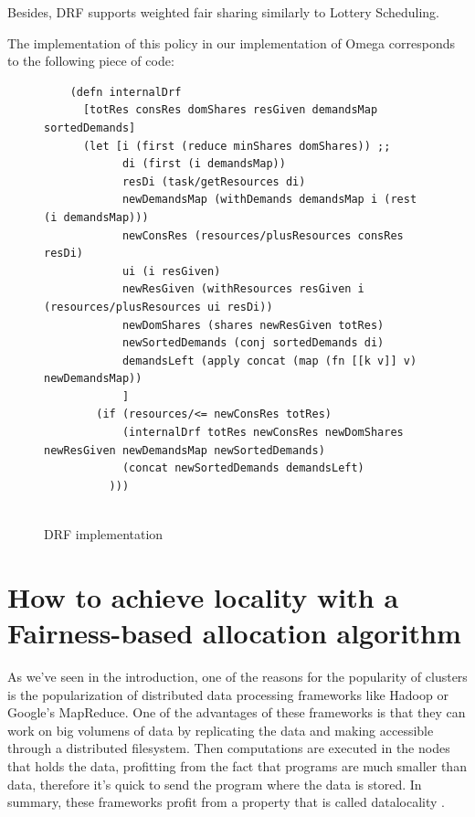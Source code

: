 \documentclass{report}                     %
\begin{document}
Besides, DRF supports weighted fair sharing similarly to Lottery
Scheduling. 

The implementation of this policy in our implementation of Omega
corresponds to the following piece of code:


\begin{figure}[!ht]
\centering
\begin{verbatim}
    (defn internalDrf
      [totRes consRes domShares resGiven demandsMap sortedDemands]
      (let [i (first (reduce minShares domShares)) ;;
            di (first (i demandsMap))
            resDi (task/getResources di)
            newDemandsMap (withDemands demandsMap i (rest (i demandsMap)))
            newConsRes (resources/plusResources consRes resDi)
            ui (i resGiven)
            newResGiven (withResources resGiven i (resources/plusResources ui resDi))
            newDomShares (shares newResGiven totRes)
            newSortedDemands (conj sortedDemands di)
            demandsLeft (apply concat (map (fn [[k v]] v) newDemandsMap))
            ]
        (if (resources/<= newConsRes totRes)
            (internalDrf totRes newConsRes newDomShares newResGiven newDemandsMap newSortedDemands)
            (concat newSortedDemands demandsLeft)
          )))


\end{verbatim}

\caption{DRF implementation}
\label{fig:drf-implementation}
\end{figure}



\section {How to achieve locality with a Fairness-based allocation algorithm}
\label{sec:delayscheduling}

As we've seen in the introduction, one of the reasons for the
popularity of clusters is the popularization of distributed data
processing frameworks like Hadoop or Google's MapReduce. One of the
advantages of these frameworks is that they can work on big volumens
of data by replicating the data and making accessible through a
distributed filesystem. Then computations are executed in the nodes
that holds the data, profitting from the fact that programs are much
smaller than data, therefore it's quick to send the program where the
data is stored. In summary, these frameworks profit from a property
that is called datalocality \cite{chung_maximizing_2006}.
\end{document}
